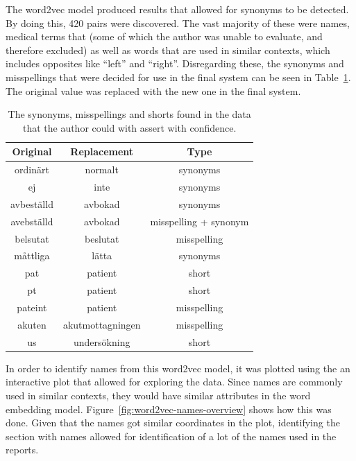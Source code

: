 The word2vec model produced results that allowed for synonyms to be detected.
By doing this, 420 pairs were discovered.
The vast majority of these were names, medical terms that (some of which the author was unable to evaluate, and therefore excluded) as well as words that are used in similar contexts, which includes opposites like ``left'' and ``right''.
Disregarding these, the synonyms and misspellings that were decided for use in the final system can be seen in Table~\ref{tab:synonyms}.
The original value was replaced with the new one in the final system.

\begin{table}
    \centering
    \begin{tabular}{|ccc|}
        \hline
        \textbf{Original} & \textbf{Replacement} & \textbf{Type} \\
        \hline
        ordinärt & normalt & synonyms \\
        ej & inte & synonyms \\
        avbeställd & avbokad & synonyms \\
        avebställd & avbokad & misspelling + synonym \\
        belsutat & beslutat & misspelling \\
        måttliga & lätta & synonyms \\
        pat & patient & short \\
        pt & patient & short \\
        pateint & patient & misspelling \\
        akuten & akutmottagningen & misspelling \\
        us & undersökning & short \\
        \hline
    \end{tabular}
    \caption{The synonyms, misspellings and shorts found in the data that the author could with assert with confidence.}
    \label{tab:synonyms}
\end{table}

In order to identify names from this word2vec model, it was plotted using the an interactive plot that allowed for exploring the data.
Since names are commonly used in similar contexts, they would have similar attributes in the word embedding model.
Figure~\ref{fig:word2vec-names-overview} shows how this was done.
Given that the names got similar coordinates in the plot, identifying the section with names allowed for identification of a lot of the names used in the reports.

